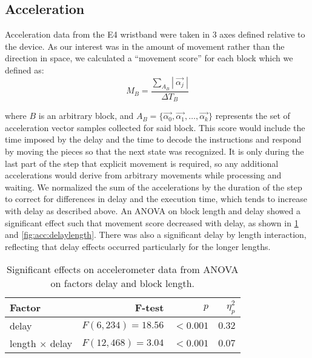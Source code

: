 \documentclass[10pt,letterpaper]{article}
\begin{document}
\subsection{Acceleration}

Acceleration data from the E4 wristband were taken in 3 axes defined relative to the device.
As our interest was in the amount of movement rather than the direction in space, we calculated a ``movement score'' for each block which we defined as:
\begin{equation}
    M_B = \frac{ \sum_{A_B} |\: \overrightarrow{\alpha_j} \:| }{\Delta T_{B}}
\end{equation}

where \( B \) is an arbitrary block, and \(A_{B} = \{ \overrightarrow{\alpha_0}, \overrightarrow{\alpha_1}, \ldots, \overrightarrow{\alpha_k} \} \) represents the set of acceleration vector samples collected for said block.
This score would include the time imposed by the delay and the time to decode the instructions and respond by moving the pieces so that the next state was recognized.
It is only during the last part of the step that explicit movement is required, so any additional accelerations would derive from arbitrary movements while processing and waiting.
We normalized the sum of the accelerations by the duration of the step to correct for differences in delay and the execution time, which tends to increase with delay as described above.
An ANOVA on block length and delay showed a significant effect such that movement score decreased with delay, as shown in \cref{tab:anova:acc} and \cref{fig:acc:delaylength}.
There was also a significant delay by length interaction, reflecting that delay effects occurred particularly for the longer lengths.

\begin{table}[h]
  \centering
  \caption{Significant effects on accelerometer data from ANOVA on factors delay and block length.}\label{tab:anova:acc}
  \setlength{\tabcolsep}{0pt} %
  \begin{tabular*}{\columnwidth}{@{\extracolsep{\fill}\quad}lrrr@{}}
    \toprule
    \textbf{Factor} & \textbf{F-test} & \textbf{\(p\)} & \textbf{\(\eta^{2}_{p}\)} \\ 
    \midrule
    delay & \(F(6, 234) = 18.56\) & \(<0.001\) & \(0.32\) \\
    length \( \times \) delay & \(F(12, 468) = 3.04\) & \(<0.001\) & \(0.07\) \\ 
    \bottomrule
  \end{tabular*}%
\end{table}
\end{document}
